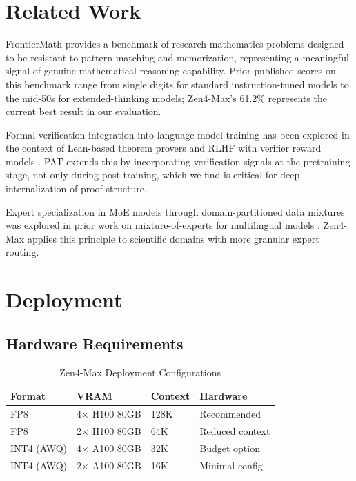 \documentclass[11pt,a4paper]{article}
\begin{document}
\section{Related Work}

FrontierMath \cite{glazer2024frontiermath} provides a benchmark of research-mathematics
problems designed to be resistant to pattern matching and memorization, representing a
meaningful signal of genuine mathematical reasoning capability. Prior published scores on
this benchmark range from single digits for standard instruction-tuned models to the
mid-50s for extended-thinking models; Zen4-Max's 61.2\% represents the current best result
in our evaluation.

Formal verification integration into language model training has been explored in the
context of Lean-based theorem provers \cite{polu2022formal} and RLHF with verifier reward
models \cite{lightman2023let}. PAT extends this by incorporating verification signals at
the pretraining stage, not only during post-training, which we find is critical for
deep internalization of proof structure.

Expert specialization in MoE models through domain-partitioned data mixtures was explored
in prior work on mixture-of-experts for multilingual models \cite{artetxe2021efficient}.
Zen4-Max applies this principle to scientific domains with more granular expert routing.

\section{Deployment}

\subsection{Hardware Requirements}

\begin{table}[H]
\centering
\begin{tabular}{llll}
\toprule
\textbf{Format} & \textbf{VRAM} & \textbf{Context} & \textbf{Hardware} \\
\midrule
FP8              & 4$\times$ H100 80GB & 128K & Recommended \\
FP8              & 2$\times$ H100 80GB & 64K  & Reduced context \\
INT4 (AWQ)       & 4$\times$ A100 80GB & 32K  & Budget option \\
INT4 (AWQ)       & 2$\times$ A100 80GB & 16K  & Minimal config \\
\bottomrule
\end{tabular}
\caption{Zen4-Max Deployment Configurations}
\end{table}
\end{document}
